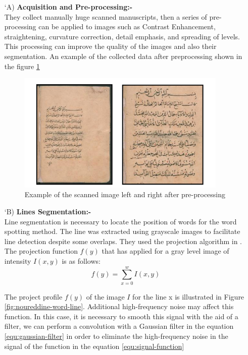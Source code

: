\begin{itemize}[labelindent=1em,labelsep=0.25cm,leftmargin=*]
        \item[\char `A)] \textbf{Acquisition and Pre-processing:-} \\
        They collect manually huge scanned manuscripts, then a  series of pre-processing can be applied to images such as Contrast Enhancement, straightening, curvature correction, detail emphasis, and spreading of levels. This processing can improve the quality of the images and also their segmentation. An example of the collected data after preprocessing shown in the figure \ref{fig:noureddine-data}
        \begin{figure}[!htb]
            \centering
            \includegraphics[width=10cm]{images/noureddine-data.png}
            \caption{Example of the scanned image left and right after pre-processing}
            \label{fig:noureddine-data}
        \end{figure}
        
        \item[\char `B)] \textbf{Lines Segmentation:-} \\
        Line segmentation is necessary to locate the position of words for the word spotting method. The line was extracted using grayscale images to facilitate line detection despite some overlaps. They used the projection algorithm in \cite{ManmathaProjectionAlgorithm}. The projection function $f(y)$ that has applied for a gray level image of intensity $I(x, y)$ is as follows:
        \begin{equation}
            f(y) = \sum_{x=0}^w I(x, y)
        \end{equation}
        
        The project profile $f(y)$ of the image $I$ for the line x is illustrated in Figure \ref{fig:noureddine-word-line}. Additional high-frequency noise may affect this function. In this case, it is necessary to smooth this signal with the aid of a filter, we can perform a convolution with a Gaussian filter in the equation \ref{equ:gaussian-filter} in order to eliminate the high-frequency noise in the signal of the function in the equation \ref{equ:signal-function}
        

\end{itemize}
